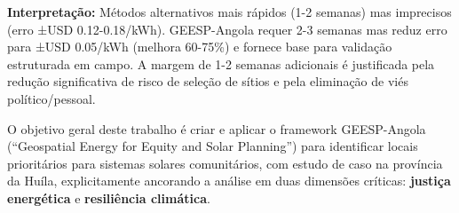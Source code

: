 \documentclass[12pt, a4paper]{article}
\begin{document}
\begin{table}[H]
\centering
\caption{Comparação de Métodos para Seleção de Sítios de Mini-Redes Solares Comunitárias}
\label{tab:metodo_comparacao}
\footnotesize
{}
\end{table}


\noindent\textbf{Interpretação:} Métodos alternativos mais rápidos (1-2 semanas) mas imprecisos (erro ±USD 0.12-0.18/kWh). GEESP-Angola requer 2-3 semanas mas reduz erro para ±USD 0.05/kWh (melhora 60-75\%) e fornece base para validação estruturada em campo. A margem de 1-2 semanas adicionais é justificada pela redução significativa de risco de seleção de sítios e pela eliminação de viés político/pessoal.

O objetivo geral deste trabalho é criar e aplicar o framework GEESP-Angola (``Geospatial Energy for Equity and Solar Planning'') para identificar locais prioritários para sistemas solares comunitários, com estudo de caso na província da Huíla, explicitamente ancorando a análise em duas dimensões críticas: 
\textbf{justiça energética} e 
\textbf{resiliência climática}.
\end{document}
